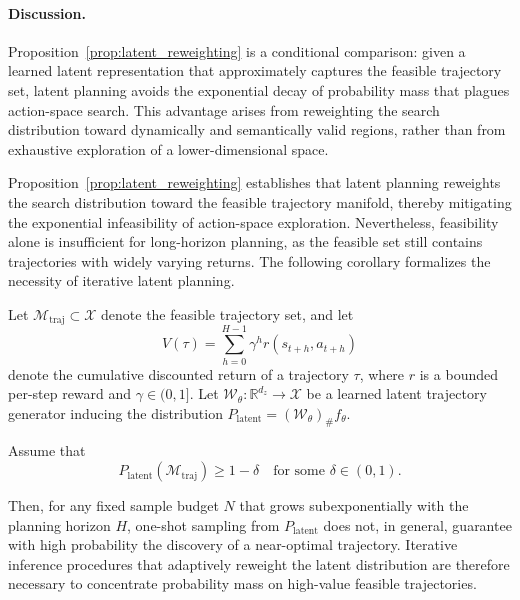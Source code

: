 \paragraph{Discussion.}
Proposition~\ref{prop:latent_reweighting} is a conditional comparison:
given a learned latent representation that approximately captures
the feasible trajectory set,
latent planning avoids the exponential decay of probability mass
that plagues action-space search.
This advantage arises from reweighting the search distribution
toward dynamically and semantically valid regions,
rather than from exhaustive exploration of a lower-dimensional space.

Proposition~\ref{prop:latent_reweighting} establishes that latent planning
reweights the search distribution toward the feasible trajectory manifold,
thereby mitigating the exponential infeasibility of action-space exploration.
Nevertheless, feasibility alone is insufficient for long-horizon planning,
as the feasible set still contains trajectories with widely varying returns.
The following corollary formalizes the necessity of iterative latent planning.
\begin{corollary}
\label{cor:iterative_inference}
Let $\mathcal{M}_{\mathrm{traj}} \subset \mathcal{X}$ denote the feasible trajectory set,
and let
\[
V(\tau)
=
\sum_{h=0}^{H-1} \gamma^h r(s_{t+h}, a_{t+h})
\]
denote the cumulative discounted return of a trajectory $\tau$,
where $r$ is a bounded per-step reward and $\gamma \in (0,1]$.
Let
$\mathcal{W}_\theta : \mathbb{R}^{d_z} \to \mathcal{X}$
be a learned latent trajectory generator inducing the distribution
$P_{\mathrm{latent}} = (\mathcal{W}_\theta)_\# f_\theta$.

Assume that
\[
P_{\mathrm{latent}}(\mathcal{M}_{\mathrm{traj}}) \ge 1 - \delta
\quad \text{for some } \delta \in (0,1).
\]

Then, for any fixed sample budget $N$ that grows subexponentially with
the planning horizon $H$, one-shot sampling from $P_{\mathrm{latent}}$
does not, in general, guarantee with high probability
the discovery of a near-optimal trajectory.
Iterative inference procedures that adaptively reweight
the latent distribution are therefore necessary
to concentrate probability mass on high-value feasible trajectories.
\end{corollary}
